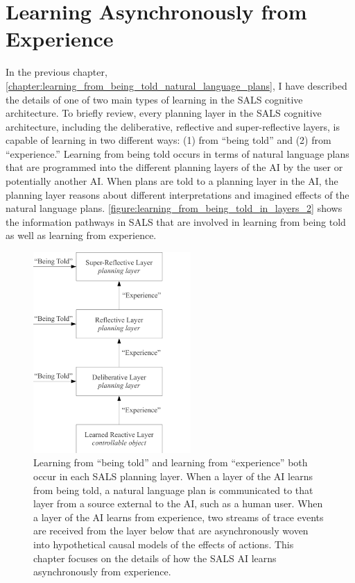 \chapter{Learning Asynchronously from Experience}
\label{chapter:learning_asynchronously_from_experience}

In the previous chapter,
{\mbox{\autoref{chapter:learning_from_being_told_natural_language_plans}}},
I have described the details of one of two main types of learning in
the SALS cognitive architecture.  To briefly review, every planning
layer in the SALS cognitive architecture, including the deliberative,
reflective and super-reflective layers, is capable of learning in two
different ways: (1) from ``being told'' and (2) from ``experience.''
Learning from being told occurs in terms of natural language plans
that are programmed into the different planning layers of the AI by
the user or potentially another AI.  When plans are told to a planning
layer in the AI, the planning layer reasons about different
interpretations and imagined effects of the natural language plans.
{\mbox{\autoref{figure:learning_from_being_told_in_layers_2}}} shows
the information pathways in SALS that are involved in learning from
being told as well as learning from experience.
\begin{figure}
\centering
\includegraphics[width=6cm]{gfx/learning_from_being_told_in_layers}
\caption[Learning from ``being told'' and learning from ``experience''
  both occur in each SALS planning layer.]{Learning from ``being
  told'' and learning from ``experience'' both occur in each SALS
  planning layer.  When a layer of the AI learns from being told, a
  natural language plan is communicated to that layer from a source
  external to the AI, such as a human user.  When a layer of the AI
  learns from experience, two streams of trace events are received
  from the layer below that are asynchronously woven into hypothetical
  causal models of the effects of actions.  This chapter focuses on
  the details of how the SALS AI learns asynchronously from
  experience.}
\label{figure:learning_from_being_told_in_layers_2}
\end{figure}
